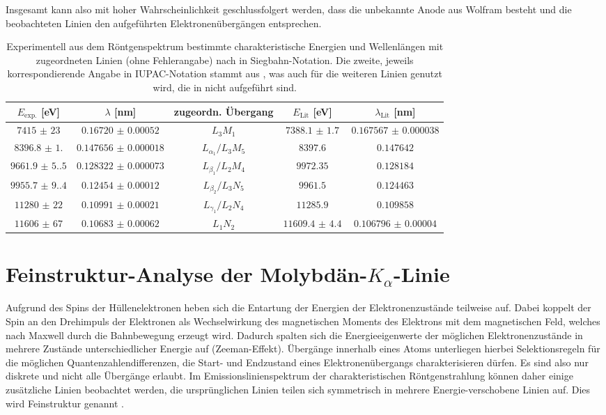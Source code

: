 Insgesamt kann also mit hoher Wahrscheinlichkeit geschlussfolgert werden, dass die unbekannte Anode aus Wolfram besteht und die beobachteten Linien den aufgeführten Elektronenübergängen entsprechen.


\begin{table}[H]
	\centering
	\begin{tabular}{|c|c||c|c|c|} \hline
    $E_\text{exp.}$ [eV] & $\lambda$ [nm] & zugeordn. Übergang & $E_\text{Lit}$ [eV] & $\lambda_\text{Lit}$ [nm] \\
    \hline
    $\num{7415(23)}$ & $\num{0.16720(52)}$ & $L_3M_1$ & $\num{7388.1(17)}$ \cite{NISTxray} & $\num{0.167567(38)}$ \\
    $\num{8396.8(1.0)}$ & $\num{0.147656(18)}$ & $L_{\alpha_1}/L_3M_5$ & $\num{8397.6}$ & $\num{0.147642}$\\
    $\num{9661.9(5.5)}$ & $\num{0.128322(73)}$ & $L_{\beta_1}/L_2M_4$  & $\num{9972.35}$ & $\num{0.128184}$\\
    $\num{9955.7(9.4)}$ & $\num{0.12454(12)}$ & $L_{\beta_2}/L_3N_5$ & $\num{9961.5}$ & $\num{0.124463}$\\
    $\num{11280(22)}$ & $\num{0.10991(21)}$ & $L_{\gamma_1}/L_2N_4$ & $\num{11285.9}$ & $\num{0.109858}$ \\
    $\num{11606(67)}$ & $\num{0.10683(62)}$ & $L_1N_2$ & $\num{11609.4(44)}$ \cite{NISTxray} & $\num{0.106796(40)}$\\
    \hline
	\end{tabular}
	\caption{Experimentell aus dem Röntgenspektrum bestimmte charakteristische Energien und Wellenlängen mit zugeordneten Linien (ohne Fehlerangabe) nach \cite{xraydatabooklet} in Siegbahn-Notation. Die zweite, jeweils korrespondierende Angabe in IUPAC-Notation stammt aus \cite{NISTxray}, was auch für die weiteren Linien genutzt wird, die in \cite{xraydatabooklet} nicht aufgeführt sind.}
	\label{tab:bragg_lines}
\end{table}


\section{Feinstruktur-Analyse der Molybdän-$K_\alpha$-Linie}

Aufgrund des Spins der Hüllenelektronen heben sich die Entartung der Energien der Elektronenzustände teilweise auf. Dabei koppelt der Spin an den Drehimpuls der Elektronen als Wechselwirkung des magnetischen Moments des Elektrons mit dem magnetischen Feld, welches nach Maxwell durch die Bahnbewegung erzeugt wird. Dadurch spalten sich die Energieeigenwerte der möglichen Elektronenzustände in mehrere Zustände unterschiedlicher Energie auf (Zeeman-Effekt). Übergänge innerhalb eines Atoms unterliegen hierbei Selektionsregeln für die möglichen Quantenzahlendifferenzen, die Start- und Endzustand eines Elektronenübergangs charakterisieren dürfen. Es sind also nur diskrete und nicht alle Übergänge erlaubt. Im Emissionslinienspektrum der charakteristischen Röntgenstrahlung können daher einige zusätzliche Linien beobachtet werden, die ursprünglichen Linien teilen sich symmetrisch in mehrere Energie-verschobene Linien auf. Dies wird Feinstruktur genannt \cite[169-175]{Demtroeder3}.

